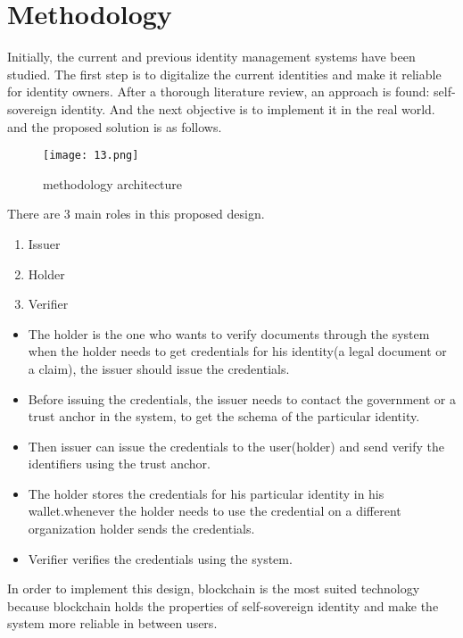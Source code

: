 \section{Methodology}

Initially, the current and previous identity management systems have been studied. The first step is to 
digitalize the current identities and make it reliable for identity owners. After a thorough literature 
review, an approach is found: self-sovereign identity. And the next objective is to implement it in the 
real world. and the proposed solution is as follows.

\begin{figure}[H]
    \centering
    \texttt{[image: 13.png]}
    \caption{methodology architecture}
    \label{fig:threshold}
  \end{figure}

  There are 3 main roles in this proposed design.
\begin{enumerate}
    \item Issuer
    \item Holder
    \item Verifier
\end{enumerate}

\begin{itemize}
    \item The holder is the one who wants to verify documents through the system when the holder needs to get credentials for his identity(a legal document or a claim), the issuer should issue the credentials.
    \item Before issuing the credentials, the issuer needs to contact the government or a trust anchor in the system, to get the schema of the particular identity.
    \item Then issuer can issue the credentials to the user(holder) and send verify the identifiers using the trust anchor.
    \item The holder stores the credentials for his particular identity in his wallet.whenever the holder needs to use the credential on a different organization holder sends the credentials.
    \item Verifier verifies the credentials using the system.
\end{itemize}

In order to implement this design, blockchain is the most suited technology because blockchain holds the properties of self-sovereign identity and make the system more reliable in between users.
  

